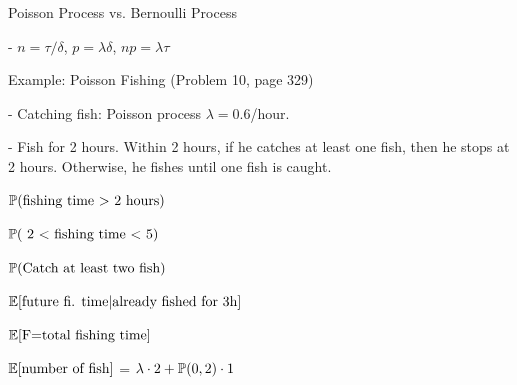 \documentclass[fleqn,aspectratio=169]{beamer}
\begin{document}
\begin{frame}{Poisson Process vs. Bernoulli Process}

- $n= \tau/\delta$, $p = \lambda \delta$, $np = \lambda \tau$

\vspace{-0.8cm}
\begin{center}
\end{center}
\vspace{-0.8cm}
\centering
{}
\end{frame}

\begin{frame}{Example: Poisson Fishing (Problem 10, page 329)}

-  Catching fish: Poisson process $\lambda = 0.6$/hour.

- Fish for 2 hours. Within 2 hours, if he catches at least one fish, then he stops at 2 hours. Otherwise, he fishes until one fish is caught.

\medskip
{}
{
\small
\plitemsep 0.05in
\bce[\bf (Q1)]
\item<2-> $\mathbb{P}( \text{fishing time $>$ 2 hours} )$ 

\smallskip
{}


\item<5->  $\mathbb{P}( \text{ 2 $<$ fishing time $<$ 5} )$ 

\smallskip
{} 


\item<8-> $\mathbb{P}( \text{Catch at least two fish} )$

\smallskip
{}


\ece
}
{
\small
\plitemsep 0.05in
\bce[\bf (Q4)]
\item<11-> $\mathbb{E}[ \text{future fi. time}|\text{already fished for 3h} ]$


\item<13->[\bf (Q5)] $\expect{$F=$\text{total fishing time}}$
\item<15->[\bf (Q6)] $\mathbb{E}[ \text{number of fish} ]$ = $\lambda \cdot 2 + \mathbb{P}( 0,2 )\cdot 1$
\ece

}

\end{frame}
\end{document}
